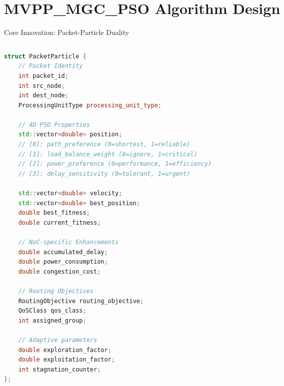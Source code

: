 \documentclass[10pt,aspectratio=169]{beamer}
\begin{document}
\section{MVPP\_MGC\_PSO Algorithm Design}

\begin{frame}[fragile]{Core Innovation: Packet-Particle Duality}
    \begin{columns}[T]
        \begin{column}{0.55\textwidth}
            \begin{lstlisting}[language=C++,caption=PacketParticle Structure (Router.hh:457-520)]
struct PacketParticle {
    // Packet Identity
    int packet_id;
    int src_node;
    int dest_node;
    ProcessingUnitType processing_unit_type;
    
    // 4D PSO Properties
    std::vector<double> position;      
    // [0]: path_preference (0=shortest, 1=reliable)
    // [1]: load_balance_weight (0=ignore, 1=critical)
    // [2]: power_preference (0=performance, 1=efficiency)
    // [3]: delay_sensitivity (0=tolerant, 1=urgent)
    
    std::vector<double> velocity;      
    std::vector<double> best_position; 
    double best_fitness;
    double current_fitness;
    
    // NoC-specific Enhancements
    double accumulated_delay;
    double power_consumption;
    double congestion_cost;
    
    // Routing Objectives
    RoutingObjective routing_objective;
    QoSClass qos_class;
    int assigned_group;
    
    // Adaptive parameters
    double exploration_factor;
    double exploitation_factor;
    int stagnation_counter;
};
            \end{lstlisting}
        \end{column}
        
        \begin{column}{0.43\textwidth}
            \begin{figure}
                \centering
\end{figure}
\end{column}
\end{columns}
\end{frame}
\end{document}

